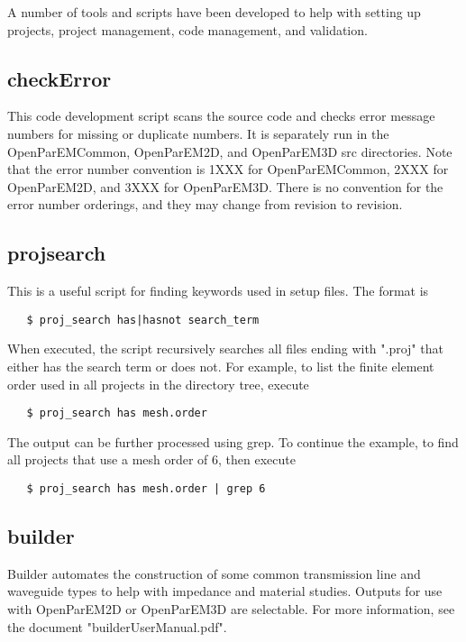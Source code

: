 \documentclass[titlepage]{article}
\renewcommand\_{\textunderscore\linebreak[1]}
\begin{document}
A number of tools and scripts have been developed to help with setting up projects, project management, code management, and validation.

\subsection{checkError}

This code development script scans the source code and checks error message numbers for missing or duplicate numbers.  It is separately run in the OpenParEMCommon, OpenParEM2D, and OpenParEM3D src directories.  Note that the error number convention is 1XXX for OpenParEMCommon, 2XXX for OpenParEM2D, and 3XXX for OpenParEM3D.  There is no convention for the error number orderings, and they may change from revision to revision.

\subsection{proj\_search}

This is a useful script for finding keywords used in setup files.  The format is

\begin{verbatim}
   $ proj_search has|hasnot search_term
\end{verbatim}

When executed, the script recursively searches all files ending with ".proj" that either has the search term or does not.  For example, to list the finite element order used in all projects in the directory tree, execute

\begin{verbatim}
   $ proj_search has mesh.order
\end{verbatim}

\noindent The output can be further processed using grep.  To continue the example, to find all projects that use a mesh order of 6, then execute
\begin{verbatim}
   $ proj_search has mesh.order | grep 6
\end{verbatim}

\subsection{builder}

Builder automates the construction of some common transmission line and waveguide types to help with impedance and material studies.  Outputs for use with OpenParEM2D or OpenParEM3D are selectable.  For more information, see the document "builder\_User\_Manual.pdf".
\end{document}
